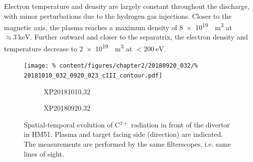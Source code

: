                 Electron temperature and density are largely constant throughout the discharge, with minor perturbations due to the hydrogen gas injections. Closer to the magnetic axis, the plasma reaches a maximum density of \SI[per-mode=reciprocal]{8e19}{\per\cubic\meter} at $\approx\SI{3}{\kilo\electronvolt}$. Further outward and closer to the separatrix, the electron density and temperature decrease to \SI[per-mode=reciprocal]{2e19}{\per\cubic\meter} at $<\SI{200}{\electronvolt}$.\\%
%
                \begin{figure}[t]%
                    \centering%
                    \texttt{[image: \%
                        content/figures/chapter2/20180920\_032/\%
                        20181010\_032\_0920\_023\_cIII\_contour.pdf]}\\%
                    \begin{subfigure}{.48\textwidth}%
                        \caption{XP20181010.32}\end{subfigure}%
                    \begin{subfigure}{.48\textwidth}%
                        \caption{XP20180920.32}\end{subfigure}%
                    \caption{Spatial-temporal evolution of C$^{3+}$ radiation in front of the divertor in HM51. Plasma and target facing side (direction) are indicated. The measurements are performed by the same filterscopes, i.e. same lines of sight.}\label{fig:20180920.32_cIII}%
                \end{figure}%
%
